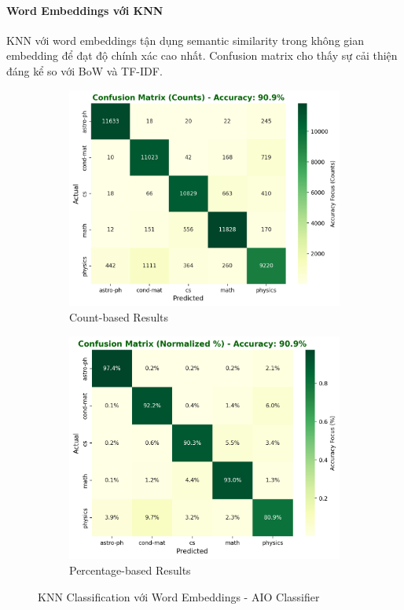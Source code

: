 \paragraph{Word Embeddings với KNN}

KNN với word embeddings tận dụng semantic similarity trong không gian embedding để đạt độ chính xác cao nhất. Confusion matrix cho thấy sự cải thiện đáng kể so với BoW và TF-IDF.

\begin{figure}[H]
\centering
\begin{subfigure}{0.48\textwidth}
    \centering
    \includegraphics[width=\textwidth]{image/Knn_embed_count.png}
    \caption{Count-based Results}
    \label{fig:knn_embed_count_improvements}
\end{subfigure}
\hfill
\begin{subfigure}{0.48\textwidth}
    \centering
    \includegraphics[width=\textwidth]{image/Knn_embed_percent.png}
    \caption{Percentage-based Results}
    \label{fig:knn_embed_percent_improvements}
\end{subfigure}
\caption{KNN Classification với Word Embeddings - AIO Classifier}
\label{fig:knn_embed_results_improvements}
\end{figure}

